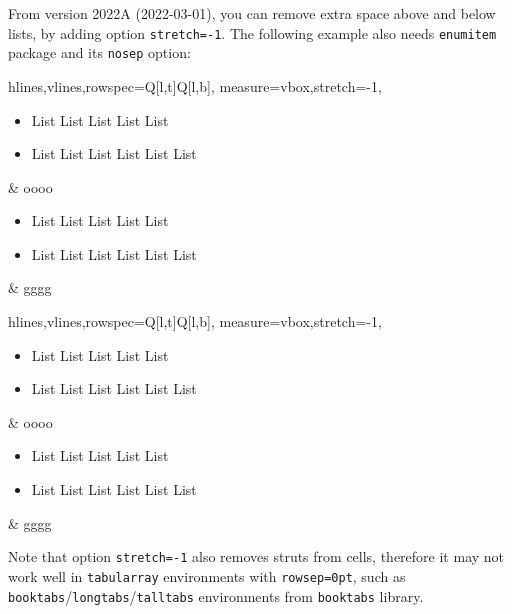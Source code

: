 \documentclass[oneside]{book}
\begin{document}
From version 2022A (2022-03-01), you can remove extra space above and below lists,
by adding option \verb!stretch=-1!.
The following example also needs \verb!enumitem! package and its \verb!nosep! option:

{\centering\begin{tblr}{
  hlines,vlines,rowspec={Q[l,t]Q[l,b]},
  measure=vbox,stretch=-1,
}
  \begin{itemize}[nosep]
    \item List List List List List
    \item List List List List List List
  \end{itemize} & oooo \\
  \begin{itemize}[nosep]
    \item List List List List List
    \item List List List List List List
  \end{itemize} & gggg \\
\end{tblr}\par}

\begin{codehigh}
\begin{tblr}{
  hlines,vlines,rowspec={Q[l,t]Q[l,b]},
  measure=vbox,stretch=-1,
}
  \begin{itemize}[nosep]
    \item List List List List List
    \item List List List List List List
  \end{itemize} & oooo \\
  \begin{itemize}[nosep]
    \item List List List List List
    \item List List List List List List
  \end{itemize} & gggg \\
\end{tblr}
\end{codehigh}

Note that option \verb!stretch=-1! also removes struts from cells, therefore it may not work well
in \verb!tabularray! environments with \verb!rowsep=0pt!, such as
\verb!booktabs!/\verb!longtabs!/\verb!talltabs! environments from \verb!booktabs! library.
\end{document}
